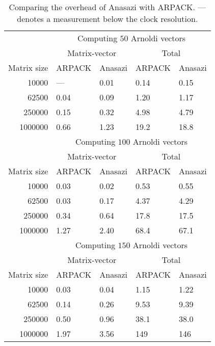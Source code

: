 \documentclass[acmtoms]{acmtrans2m}
\begin{document}
\begin{table}
\caption{Comparing the overhead of Anasazi with ARPACK. --- denotes a measurement
below the clock resolution.}
\label{table:timings}
\begin{center}
\begin{tabular}{r|ll|ll|}
       \cline{2-5} %
        & \multicolumn{4}{c|}{Computing $50$ Arnoldi vectors} \\ \cline{2-5}
        & \multicolumn{2}{c|}{Matrix-vector} &
       \multicolumn{2}{c|}{Total}\\ \hline
       Matrix size & ARPACK & Anasazi & ARPACK & Anasazi \\ \hline %
       10000 & --- & 0.01 & 0.14 & 0.15 \\
       62500 & 0.04 & 0.09 & 1.20 & 1.17 \\
       250000 & 0.15 & 0.32 & 4.98 & 4.79 \\
       1000000 & 0.66 & 1.23 & 19.2 & 18.8 \\
       \hline
        & \multicolumn{4}{c|}{Computing $100$ Arnoldi vectors} \\ \cline{2-5}
        & \multicolumn{2}{c|}{Matrix-vector} &
       \multicolumn{2}{c|}{Total}\\ \hline
       Matrix size & ARPACK & Anasazi & ARPACK & Anasazi \\ \hline %
       10000 & 0.03 & 0.02 & 0.53 & 0.55 \\
       62500 & 0.03 & 0.17 & 4.37 & 4.29 \\
       250000 & 0.34 & 0.64 & 17.8 & 17.5 \\
       1000000 & 1.27 & 2.40 & 68.4 & 67.1 \\
       \hline
        & \multicolumn{4}{c|}{Computing $150$ Arnoldi vectors} \\ \cline{2-5}
        & \multicolumn{2}{c|}{Matrix-vector} &
       \multicolumn{2}{c|}{Total}\\ \hline
       Matrix size & ARPACK & Anasazi & ARPACK & Anasazi \\ \hline %
       10000 & 0.03 & 0.04 & 1.15 & 1.22 \\
       62500 & 0.14 & 0.26 & 9.53 & 9.39 \\
       250000 & 0.50 & 0.96 & 38.1 & 38.0 \\
       1000000 & 1.97 & 3.56 & 149 & 146 \\
       \hline
     \end{tabular}
\end{center}
\end{table}
\end{document}

